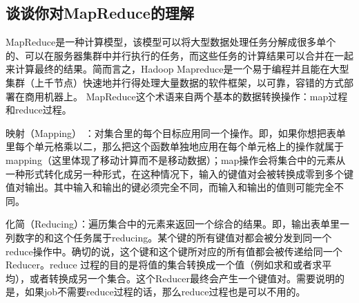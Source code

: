 \documentclass[../../../interview-questions.tex]{subfiles}
\begin{document}
\subsection{谈谈你对MapReduce的理解}

MapReduce是一种计算模型，该模型可以将大型数据处理任务分解成很多单个的、可以在服务器集群中并行执行的任务，而这些任务的计算结果可以合并在一起来计算最终的结果。简而言之，Hadoop Mapreduce是一个易于编程并且能在大型集群（上千节点）快速地并行得处理大量数据的软件框架，以可靠，容错的方式部署在商用机器上。
MapReduce这个术语来自两个基本的数据转换操作：map过程和reduce过程。

映射（Mapping） ：对集合里的每个目标应用同一个操作。即，如果你想把表单里每个单元格乘以二，那么把这个函数单独地应用在每个单元格上的操作就属于mapping（这里体现了移动计算而不是移动数据）；map操作会将集合中的元素从一种形式转化成另一种形式，在这种情况下，输入的键值对会被转换成零到多个键值对输出。其中输入和输出的键必须完全不同，而输入和输出的值则可能完全不同。

化简（Reducing）：遍历集合中的元素来返回一个综合的结果。即，输出表单里一列数字的和这个任务属于reducing。某个键的所有键值对都会被分发到同一个reduce操作中。确切的说，这个键和这个键所对应的所有值都会被传递给同一个Reducer。reduce
过程的目的是将值的集合转换成一个值（例如求和或者求平均），或者转换成另一个集合。这个Reducer最终会产生一个键值对。需要说明的是，如果job不需要reduce过程的话，那么reduce过程也是可以不用的。
\end{document}
